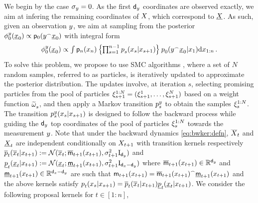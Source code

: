 We begin by the case $\sigma_y=0$. As the first $\mathsf{d}_y$ coordinates are observed exactly, we aim at infering the remaining coordinates of $X$,%
which correspond to $\underline{X}$.
As such, given an observation $y$, we aim at sampling from the posterior $\smash{\filter{0}{\lmeas}{\lbottomstate_0}} \propto \bwmarg{0}{\cat{\lmeas}{\lbottomstate_0}}$ with integral form
\begin{equation} 
    \label{eq:posterior:integral_form}
    \filter{0}{\lmeas}{\lbottomstate_0} \propto \textstyle \int \bwmarg{n}{\lstate_n} \left\{ \prod_{s = 1}^{n-1} \bwtrans{}{s}{\lstate_{s+1}}{\lstate_s} \right\} \bwtrans{}{0}{\lstate_1}{\cat{\lmeas}{\lbottomstate_0}} \rmd \lstate_{1:n} \eqsp.
\end{equation}
To solve this problem, we propose to use SMC algorithms \cite{doucet2001sequential, infhidden, chopin2020introduction}, where a set of $N$ random samples, referred to as particles, is iteratively updated to approximate the posterior distribution. The updates involve, at iteration $s$, selecting promising particles from the pool of particles $\xi_{s+1} ^{1:N} = (\xi^1 _{s+1}, \dotsc, \xi^N _{s+1})$ based on a weight function $\widetilde{\omega}^{} _{s}$, and then apply a Markov transition $\bwopt{s}{\lmeas}{}{}$ to obtain the samples $\xi_{s} ^{1:N}$.
    The transition $\bwopt{s}{\lmeas}{\lstate_{s+1}}{\lstate_s}$ is designed to follow the backward process while guiding the $\mathsf{d}_y$ top coordinates of the pool of particles $\xi_s ^{1:N}$ towards the measurement $y$.
Note that under the backward dynamics \eqref{eq:bwker:defn}, $\smash{\overline{X}}_t$ and $\underline{X}_t$ are independent conditionally on $X_{t+1}$ with transition kernels respectively
        $\tbwtrans{}{t}{\lstate_{t+1}}{\ltopstate_{t}}  \eqdef \normpdf(\ltopstate_{t}; \tbwmean_{t+1}(\lstate_{t+1}), \sigma^2 _{t+1} \Id_{\dimorig})$ and $
        \bbwtrans{}{t}{\lstate_{t+1}}{\lbottomstate_{t}}  \eqdef \normpdf(\lbottomstate_{t}; \bbwmean_{t+1}(\lstate_{t+1}), \sigma^2 _{t+1} \Id_{\dimx - \dimorig})$
    where $\overline{\mathsf{m}}_{t+1}(x_{t+1}) \in \mathbb{R}^{\mathsf{d}_y}$ and $\underline{\mathsf{m}}_{t+1}(x_{t+1}) \in \mathbb{R}^{{\mathsf{d}_x} - \mathsf{d}_y}$ are such that $\mathsf{m}_{t+1}(x_{t+1}) = {\overline{\mathsf{m}}_{t+1}(x_{t+1})}^{\scriptscriptstyle\frown}\underline{\mathsf{m}}_{t+1}(x_{t+1})$ and the above kernels satisfy $\bwtrans{}{t}{\lstate_{s+1}}{\lstate_s} = \tbwtrans{}{t}{\lstate_{t+1}}{\ltopstate_{t}} \bbwtrans{}{t}{\lstate_{t+1}}{\lbottomstate_{t}}$. We consider the following proposal kernels for $t \in [1:n]$,
